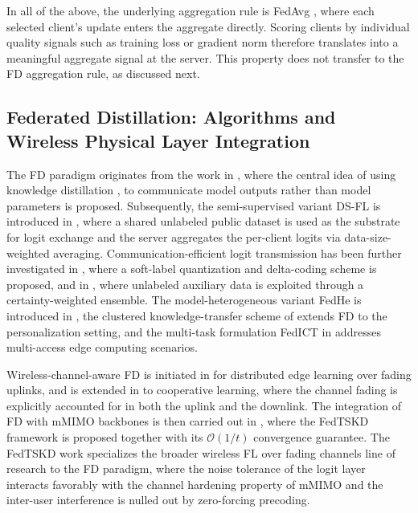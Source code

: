 \documentclass[journal]{IEEEtran}
\begin{document}
In all of the above, the underlying aggregation rule is FedAvg \cite{mcmahan2017communication}, where each selected client's update enters the aggregate directly. Scoring clients by individual quality signals such as training loss or gradient norm therefore translates into a meaningful aggregate signal at the server. This property does not transfer to the FD aggregation rule, as discussed next.

\subsection{Federated Distillation: Algorithms and Wireless Physical Layer Integration}
\label{ssec:rw-fd}

The FD paradigm originates from the work in \cite{jeong2018communication}, where the central idea of using knowledge distillation \cite{hinton2015distilling}, \cite{wang2022kd} to communicate model outputs rather than model parameters is proposed. Subsequently, the semi-supervised variant DS-FL is introduced in \cite{itahara2023distillation}, where a shared unlabeled public dataset is used as the substrate for logit exchange and the server aggregates the per-client logits via data-size-weighted averaging. Communication-efficient logit transmission has been further investigated in \cite{sattler2022cfd}, where a soft-label quantization and delta-coding scheme is proposed, and in \cite{sattler2023fedaux}, where unlabeled auxiliary data is exploited through a certainty-weighted ensemble. The model-heterogeneous variant FedHe is introduced in \cite{chan2021fedhe}, the clustered knowledge-transfer scheme of \cite{cho2023clustered} extends FD to the personalization setting, and the multi-task formulation FedICT in \cite{wu2024fedict} addresses multi-access edge computing scenarios.

Wireless-channel-aware FD is initiated in \cite{ahn2019wireless} for distributed edge learning over fading uplinks, and is extended in \cite{ahn2020cooperative} to cooperative learning, where the channel fading is explicitly accounted for in both the uplink and the downlink. The integration of FD with mMIMO backbones is then carried out in \cite{mu2024fedtskd}, where the FedTSKD framework is proposed together with its $\mathcal{O}(1/t)$ convergence guarantee. The FedTSKD work specializes the broader wireless FL over fading channels line of research \cite{amiri2020federated, amiri2020machine, vu2020cell, amiri2021convergence} to the FD paradigm, where the noise tolerance of the logit layer interacts favorably with the channel hardening property of mMIMO and the inter-user interference is nulled out by zero-forcing precoding.
\end{document}
